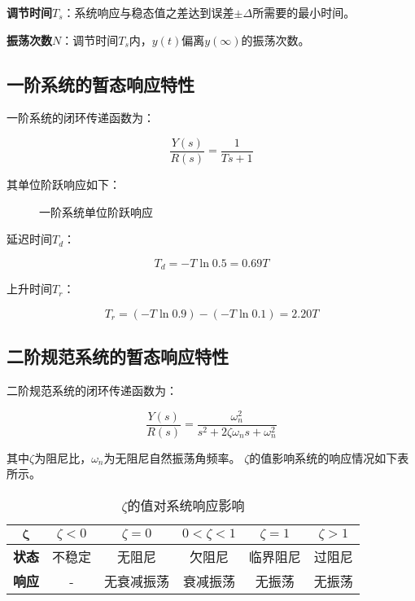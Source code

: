 \documentclass[cn, blue, normal, 12pt]{elegantnote}
\begin{document}
\textbf{调节时间}$T_s$：系统响应与稳态值之差达到误差$\pm\Delta$所需要的最小时间。

\textbf{振荡次数}$N$：调节时间$T_s$内，$y(t)$偏离$y(\infty)$的振荡次数。

\subsection{一阶系统的暂态响应特性}

一阶系统的闭环传递函数为：

\begin{equation}
    \frac{Y(s)}{R(s)}=\frac{1}{Ts+1}
\end{equation}

其单位阶跃响应如下：

\begin{figure}[htbp]
    \centering
    
    \caption{一阶系统单位阶跃响应}
\end{figure}

延迟时间$T_d$：

\begin{equation}
    T_d=-T\ln{0.5}=0.69T
\end{equation}

上升时间$T_r$：

\begin{equation}
    T_r=(-T\ln{0.9})-(-T\ln{0.1})=2.20T
\end{equation}

\subsection{二阶规范系统的暂态响应特性}

二阶规范系统的闭环传递函数为：

\begin{equation}
    \frac{Y(s)}{R(s)}=\frac{\omega_n^2}{s^2+2\zeta\omega_n s+\omega_n^2}
\end{equation}

其中$\zeta$为阻尼比，$\omega_n$为无阻尼自然振荡角频率。
$\zeta$的值影响系统的响应情况如下表所示。

\begin{table}[htbp]
    \label{tab:zeta}
    \begin{center}
      \caption{$\zeta$的值对系统响应影响}
      \begin{tabular}{c|c|c|c|c|c}
        \hline
        $\bm{\zeta}$ & $\zeta<0$ & $\zeta=0$ & $0<\zeta<1$ & $\zeta=1$ & $\zeta>1$ \\
        \hline
        \textbf{状态} & 不稳定 & 无阻尼 & 欠阻尼 & 临界阻尼 & 过阻尼 \\
        \hline
        \textbf{响应} & - & 无衰减振荡 & 衰减振荡 & 无振荡 & 无振荡 \\
        \hline
      \end{tabular}
    \end{center}
\end{table}
\end{document}
